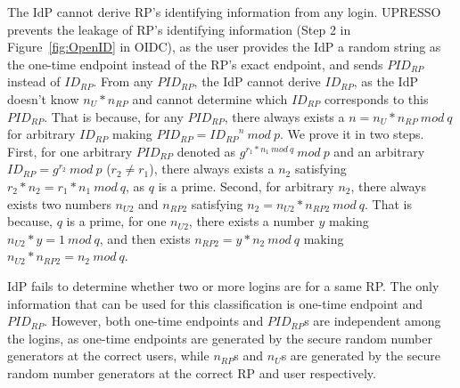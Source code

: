 The IdP cannot derive RP's identifying information from any login.
UPRESSO prevents the leakage of RP's identifying information (Step 2 in Figure~\ref{fig:OpenID} in OIDC), as the user provides the IdP a random string as the one-time endpoint instead of the RP's exact endpoint, and sends $PID_{RP}$ instead of $ID_{RP}$.
From any $PID_{RP}$, the IdP cannot derive $ID_{RP}$, as the IdP doesn't know $n_U*n_{RP}$ and cannot determine which $ID_{RP}$ corresponds to this $PID_{RP}$.
That is because,
for any $PID_{RP}$, there always exists a $n=n_U*n_{RP}\ mod\ q$ for arbitrary $ID_{RP}$ making $PID_{RP}={ID_{RP}}^n \ mod\ p$.
We prove it in two steps.
First, for one arbitrary $PID_{RP}$ denoted  as $g^{r_1*n_1\ mod\ q}\ mod\ p$ and  an arbitrary  $ID_{RP}=g^{r_2}\ mod\ p$ ($r_2 \neq r_1$),  there always exists a $n_2$ satisfying $r_2*n_2=r_1*n_1\ mod\ q$, as $q$ is a prime.
Second, for arbitrary $n_2$, there always exists two numbers $n_{U2}$ and $n_{RP2}$ satisfying $n_2= n_{U2}*n_{RP2}\ mod\ q$.
That is because, $q$ is a prime, for one $n_{U2}$, there exists a number $y$ making $n_{U2}*y=1\ mod\ q$, and then exists $n_{RP2}= y*n_2\ mod\ q$ making $n_{U2}*n_{RP2}=n_2\ mod\ q$.



IdP fails to determine whether two or more logins are for a same RP. The only information that can be used for this classification is one-time endpoint and $PID_{RP}$. However, both one-time endpoints and $PID_{RP}$s are independent among the logins, as one-time endpoints are generated by the secure random number generators at the correct users, while $n_{RP}$s and $n_{U}$s are generated by the secure random number generators at the correct RP and user respectively.


